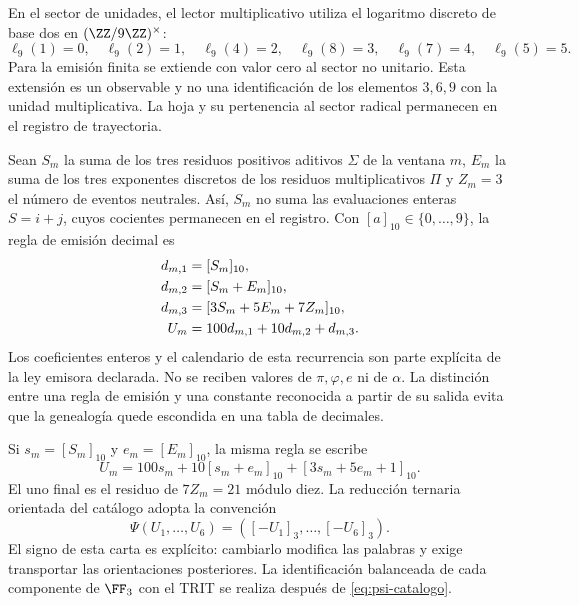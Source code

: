 En el sector de unidades, el lector multiplicativo utiliza el logaritmo discreto de base dos en \((\ZZ/9\ZZ)^\times\):
\[
 \ell_9(1)=0,\quad\ell_9(2)=1,\quad\ell_9(4)=2,\quad
 \ell_9(8)=3,\quad\ell_9(7)=4,\quad\ell_9(5)=5.
\]
Para la emisión finita se extiende con valor cero al sector no unitario. Esta extensión es un observable y no una identificación de los elementos \(3,6,9\) con la unidad multiplicativa. La hoja y su pertenencia al sector radical permanecen en el registro de trayectoria.

Sean \(S_m\) la suma de los tres residuos positivos aditivos \(\Sigma\) de la ventana \(m\), \(E_m\) la suma de los tres exponentes discretos de los residuos multiplicativos \(\Pi\) y \(Z_m=3\) el número de eventos neutrales. Así, \(S_m\) no suma las evaluaciones enteras \(S=i+j\), cuyos cocientes permanecen en el registro. Con \([a]_{10}\in\{0,\ldots,9\}\), la regla de emisión decimal es
\begin{align}
 d_{m,1}&=[S_m]_{10},\notag\\
 d_{m,2}&=[S_m+E_m]_{10},\notag\\
 d_{m,3}&=[3S_m+5E_m+7Z_m]_{10},\notag\\
 U_m&=100d_{m,1}+10d_{m,2}+d_{m,3}.
 \label{eq:emisor-seis}
\end{align}
Los coeficientes enteros y el calendario de esta recurrencia son parte explícita de la ley emisora declarada. No se reciben valores de \(\pi,\varphi,e\) ni de \(\alpha\). La distinción entre una regla de emisión y una constante reconocida a partir de su salida evita que la genealogía quede escondida en una tabla de decimales.

Si \(s_m=[S_m]_{10}\) y \(e_m=[E_m]_{10}\), la misma regla se escribe
\begin{equation}
 U_m=100s_m+10[s_m+e_m]_{10}+[3s_m+5e_m+1]_{10}.
 \label{eq:acoplamiento}
\end{equation}
El uno final es el residuo de \(7Z_m=21\) módulo diez. La reducción ternaria orientada del catálogo adopta la convención
\begin{equation}
 \Psi(U_1,\ldots,U_6)=([-U_1]_3,\ldots,[-U_6]_3).
 \label{eq:psi-catalogo}
\end{equation}
El signo de esta carta es explícito: cambiarlo modifica las palabras y exige transportar las orientaciones posteriores. La identificación balanceada de cada componente de \(\FF_3\) con el TRIT se realiza después de \eqref{eq:psi-catalogo}.

